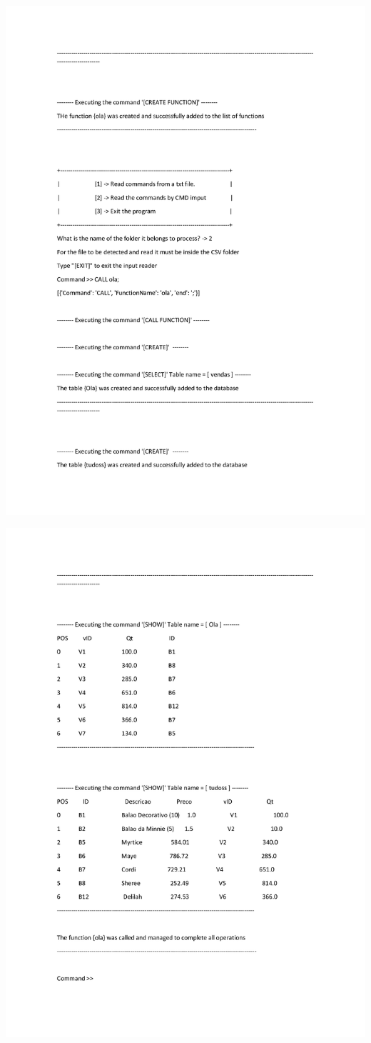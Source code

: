\documentclass{article}
\begin{document}
\noindent
\includegraphics[width=1.3\textwidth]{6}

\noindent
\includegraphics[width=1.3\textwidth]{7}
\end{document}
